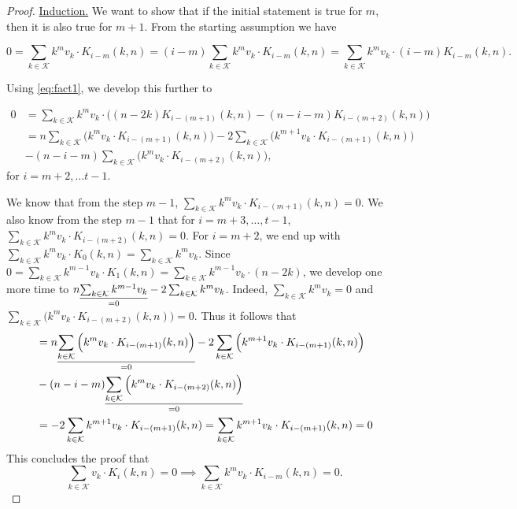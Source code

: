 \begin{proof}
    \underline{Induction.} We want to show that if the initial statement is true for $m$, then it is also true for $m+1$. From the starting assumption we have

    $$
    0 = \sum_{k \in \mathcal{K}} k^mv_k \cdot K_{i-m}(k, n) = (i-m)\sum_{k \in \mathcal{K}} k^mv_k \cdot K_{i-m}(k, n) = \sum_{k \in \mathcal{K}} k^mv_k \cdot (i-m)K_{i-m}(k, n).
    $$

    Using \cref{eq:fact1}, we develop this further to

    \begin{equation*}
    \begin{split}
        0 &= \sum_{k \in \mathcal{K}} k^mv_k \cdot \Big( (n - 2k)K_{i - (m+1)}(k, n) - (n - i - m)K_{i - (m + 2)}(k, n) \Big)\\
        & = n \sum_{k \in \mathcal{K}} \Big( k^mv_k \cdot K_{i - (m+1)}(k, n) \Big) - 2\sum_{k \in \mathcal{K}} \Big( k^{m+1}v_k \cdot K_{i - (m+1)}(k, n) \Big)\\& - (n - i - m)\sum_{k \in \mathcal{K}} \Big( k^mv_k \cdot K_{i - (m+2)}(k, n) \Big),
    \end{split}
    \end{equation*}
    for $i = m+2, \ldots t-1$.

    We know that from the step $m-1$, $\sum_{k \in \mathcal{K}} k^mv_k \cdot K_{i - (m+1)}(k, n) = 0$. We also know from the step $m-1$ that for $i = m+3, \ldots, t-1$, $\sum_{k \in \mathcal{K}} k^mv_k \cdot K_{i - (m+2)}(k, n) = 0$. For $i = m + 2$, we end up with $\sum_{k \in \mathcal{K}} k^mv_k \cdot K_0(k, n) = \sum_{k \in \mathcal{K}} k^mv_k$. Since $0 = \sum_{k \in \mathcal{K}} k^{m-1}v_k \cdot K_1(k, n) = \sum_{k \in \mathcal{K}} k^{m-1}v_k \cdot (n - 2k)$, we develop one more time to $n\underset{=0}{\underline{\sum_{k \in \mathcal{K}} k^{m-1}v_k}} - 2\sum_{k \in \mathcal{K}}k^mv_k$. Indeed, $\sum_{k \in \mathcal{K}}k^mv_k = 0$ and $\sum_{k \in \mathcal{K}} \Big( k^mv_k \cdot K_{i - (m+2)}(k, n) \Big) = 0$. Thus it follows that
    \begin{equation*}
    \begin{split}
        & = n \underset{=0}{\underline{\sum_{k \in \mathcal{K}} \Big( k^mv_k \cdot K_{i - (m+1)}(k, n) \Big)}} - 2\sum_{k \in \mathcal{K}} \Big( k^{m+1}v_k \cdot K_{i - (m+1)}(k, n) \Big)\\& - (n - i - m)\underset{=0}{\underline{\sum_{k \in \mathcal{K}} \Big( k^mv_k \cdot K_{i - (m+2)}(k, n) \Big)}}\\
        &= -2\sum_{k \in \mathcal{K}} k^{m+1}v_k \cdot K_{i - (m+1)}(k, n) = \sum_{k \in \mathcal{K}} k^{m+1}v_k \cdot K_{i - (m+1)}(k, n) = 0
    \end{split}
    \end{equation*}
    This concludes the proof that
    $$\sum_{k \in \mathcal{K}} v_k \cdot K_i(k, n) = 0 \implies \sum_{k \in \mathcal{K}} k^mv_k \cdot K_{i-m}(k, n) = 0.$$


\end{proof}
